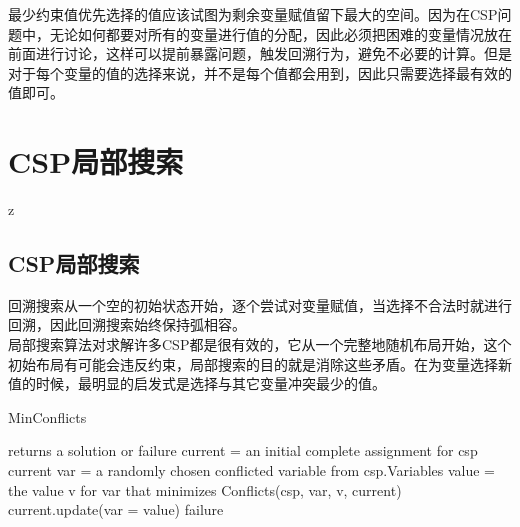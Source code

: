 最少约束值优先选择的值应该试图为剩余变量赋值留下最大的空间。因为在CSP问题中，无论如何都要对所有的变量进行值的分配，因此必须把困难的变量情况放在前面进行讨论，这样可以提前暴露问题，触发回溯行为，避免不必要的计算。但是对于每个变量的值的选择来说，并不是每个值都会用到，因此只需要选择最有效的值即可。\\

\newpage

\section{CSP局部搜索}
z
\subsection{CSP局部搜索}

回溯搜索从一个空的初始状态开始，逐个尝试对变量赋值，当选择不合法时就进行回溯，因此回溯搜索始终保持弧相容。\\

局部搜索算法对求解许多CSP都是很有效的，它从一个完整地随机布局开始，这个初始布局有可能会违反约束，局部搜索的目的就是消除这些矛盾。在为变量选择新值的时候，最明显的启发式是选择与其它变量冲突最少的值。\\

\begin{algorithm}[H]
    \caption{MinConflicts}
    \begin{algorithmic}[1]
         returns a solution or failure
        \State current = an initial complete assignment for csp
        \State \Return current
        \EndIf
        \State var = a randomly chosen conflicted variable from csp.Variables
        \State value = the value v for var that minimizes Conflicts(csp, var, v, current)
        \State current.update({var = value})
        \EndFor
        \State \Return failure
        \EndProcedure
    \end{algorithmic}
\end{algorithm}

\newpage